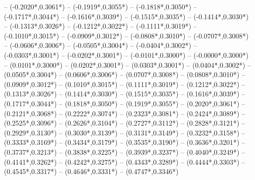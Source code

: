 {	-- ({-0.2020*\dx},{0.3061*\dy})
	-- ({-0.1919*\dx},{0.3055*\dy})
	-- ({-0.1818*\dx},{0.3050*\dy})
	-- ({-0.1717*\dx},{0.3044*\dy})
	-- ({-0.1616*\dx},{0.3039*\dy})
	-- ({-0.1515*\dx},{0.3035*\dy})
	-- ({-0.1414*\dx},{0.3030*\dy})
	-- ({-0.1313*\dx},{0.3026*\dy})
	-- ({-0.1212*\dx},{0.3022*\dy})
	-- ({-0.1111*\dx},{0.3019*\dy})
	-- ({-0.1010*\dx},{0.3015*\dy})
	-- ({-0.0909*\dx},{0.3012*\dy})
	-- ({-0.0808*\dx},{0.3010*\dy})
	-- ({-0.0707*\dx},{0.3008*\dy})
	-- ({-0.0606*\dx},{0.3006*\dy})
	-- ({-0.0505*\dx},{0.3004*\dy})
	-- ({-0.0404*\dx},{0.3002*\dy})
	-- ({-0.0303*\dx},{0.3001*\dy})
	-- ({-0.0202*\dx},{0.3001*\dy})
	-- ({-0.0101*\dx},{0.3000*\dy})
	-- ({-0.0000*\dx},{0.3000*\dy})
	-- ({0.0101*\dx},{0.3000*\dy}) %
	-- ({0.0202*\dx},{0.3001*\dy}) %
	-- ({0.0303*\dx},{0.3001*\dy}) %
	-- ({0.0404*\dx},{0.3002*\dy}) %
	-- ({0.0505*\dx},{0.3004*\dy}) %
	-- ({0.0606*\dx},{0.3006*\dy}) %
	-- ({0.0707*\dx},{0.3008*\dy}) %
	-- ({0.0808*\dx},{0.3010*\dy}) %
	-- ({0.0909*\dx},{0.3012*\dy}) %
	-- ({0.1010*\dx},{0.3015*\dy}) %
	-- ({0.1111*\dx},{0.3019*\dy}) %
	-- ({0.1212*\dx},{0.3022*\dy}) %
	-- ({0.1313*\dx},{0.3026*\dy}) %
	-- ({0.1414*\dx},{0.3030*\dy}) %
	-- ({0.1515*\dx},{0.3035*\dy}) %
	-- ({0.1616*\dx},{0.3039*\dy}) %
	-- ({0.1717*\dx},{0.3044*\dy}) %
	-- ({0.1818*\dx},{0.3050*\dy}) %
	-- ({0.1919*\dx},{0.3055*\dy}) %
	-- ({0.2020*\dx},{0.3061*\dy}) %
	-- ({0.2121*\dx},{0.3068*\dy}) %
	-- ({0.2222*\dx},{0.3074*\dy}) %
	-- ({0.2323*\dx},{0.3081*\dy}) %
	-- ({0.2424*\dx},{0.3089*\dy}) %
	-- ({0.2525*\dx},{0.3096*\dy}) %
	-- ({0.2626*\dx},{0.3104*\dy}) %
	-- ({0.2727*\dx},{0.3112*\dy}) %
	-- ({0.2828*\dx},{0.3121*\dy}) %
	-- ({0.2929*\dx},{0.3130*\dy}) %
	-- ({0.3030*\dx},{0.3139*\dy}) %
	-- ({0.3131*\dx},{0.3149*\dy}) %
	-- ({0.3232*\dx},{0.3158*\dy}) %
	-- ({0.3333*\dx},{0.3169*\dy}) %
	-- ({0.3434*\dx},{0.3179*\dy}) %
	-- ({0.3535*\dx},{0.3190*\dy}) %
	-- ({0.3636*\dx},{0.3201*\dy}) %
	-- ({0.3737*\dx},{0.3213*\dy}) %
	-- ({0.3838*\dx},{0.3225*\dy}) %
	-- ({0.3939*\dx},{0.3237*\dy}) %
	-- ({0.4040*\dx},{0.3249*\dy}) %
	-- ({0.4141*\dx},{0.3262*\dy}) %
	-- ({0.4242*\dx},{0.3275*\dy}) %
	-- ({0.4343*\dx},{0.3289*\dy}) %
	-- ({0.4444*\dx},{0.3303*\dy}) %
	-- ({0.4545*\dx},{0.3317*\dy}) %
	-- ({0.4646*\dx},{0.3331*\dy}) %
	-- ({0.4747*\dx},{0.3346*\dy}) %
}

